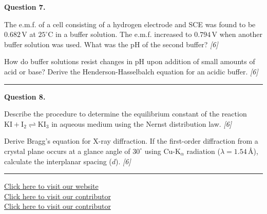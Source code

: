 \documentclass[11pt,a4paper]{article}
\newcommand{\pts}[1]{\hfill   \textit{[#1]}}
\begin{document}
\noindent   \textbf{Question 7.}

\begin{parts}
  \item The e.m.f. of a cell consisting of a hydrogen electrode and SCE was found to be $0.682\, \text{V}$ at $25^\circ \text{C}$ in a buffer solution. The e.m.f. increased to $0.794\, \text{V}$ when another buffer solution was used. What was the pH of the second buffer? \pts{6}
  \item How do buffer solutions resist changes in pH upon addition of small amounts of acid or base? Derive the Henderson-Hasselbalch equation for an acidic buffer. \pts{6}
\end{parts}

\medskip\rule{\linewidth}{0.2pt}




\noindent   \textbf{Question 8.}

\begin{parts}
  \item Describe the procedure to determine the equilibrium constant of the reaction $ \text{KI} +  \text{I}_2 \rightleftharpoons  \text{KI}_3$ in aqueous medium using the Nernst distribution law. \pts{6}
  \item Derive Bragg's equation for X-ray diffraction. If the first-order diffraction from a crystal plane occurs at a glance angle of $30^\circ$ using $ \text{Cu-K}_\alpha$ radiation ($\lambda = 1.54\, \text{\AA}$), calculate the interplanar spacing ($d$). \pts{6}
\end{parts}

\vfill
\rule{\linewidth}{0.4pt}

\begin{center}\small
  \href{https://bhu-exam.vercel.app/}{Click here to visit our website}\\[4pt]
  \href{https://me-aryan.vercel.app/}{Click here to visit our contributor}\\[4pt]
  \href{https://quashan-me.vercel.app/}{Click here to visit our contributor}
\end{center}
\end{document}
